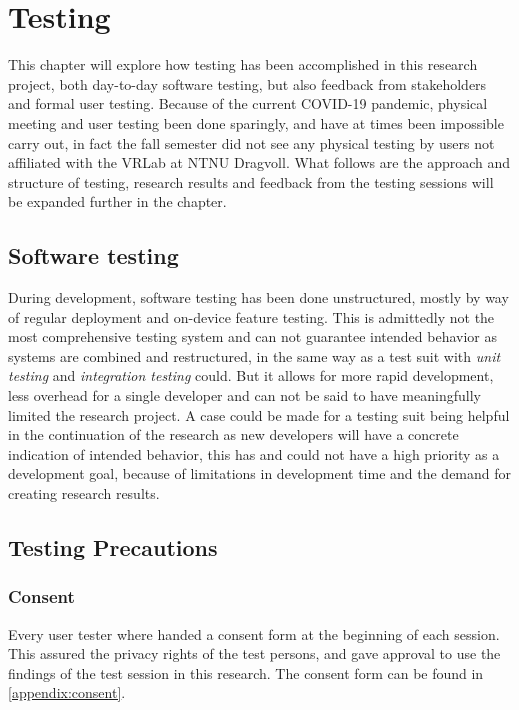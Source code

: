 \chapter{Testing}


This chapter will explore how testing has been accomplished in this research project, both day-to-day software testing, but also feedback from stakeholders and formal user testing. Because of the current COVID-19 pandemic, physical meeting and user testing been done sparingly, and have at times been impossible carry out, in fact the fall semester did not see any physical testing by users not affiliated with the VRLab at NTNU Dragvoll. What follows are the approach and structure of testing, research results and feedback from the testing sessions will be expanded further in the  chapter.

\section{Software testing}
During development, software testing has been done unstructured, mostly by way of regular deployment and on-device feature testing. This is admittedly not the most comprehensive testing system and can not guarantee intended behavior as systems are combined and restructured, in the same way as a test suit with \textit{unit testing} and \textit{integration testing} could. But it allows for more rapid development, less overhead for a single developer and can not be said to have meaningfully limited the research project. A case could be made for a testing suit being helpful in the continuation of the research as new developers will have a concrete indication of intended behavior, this has and could not have a high priority as a development goal, because of limitations in development time and the demand for creating research results.

\section{Testing Precautions}

\subsection{Consent}
Every user tester where handed a consent form at the beginning of each session. This assured the privacy rights of the test persons, and gave approval to use the findings of the test session in this research. The consent form can be found in \autoref{appendix:consent}.

